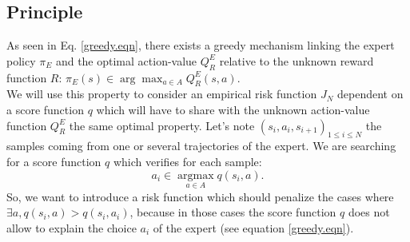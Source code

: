\documentclass{article}
\newcommand{\argmax}{\operatorname*{argmax}} %
\begin{document}
\subsection{Principle}
As seen in Eq. \eqref{greedy.eqn}, there exists a greedy mechanism linking the expert policy $\pi_E$ and the optimal action-value $Q^E_R$ relative to the unknown reward function $R$: $\pi_E(s) \in \arg\max_{a\in A}Q^E_R(s,a)$.\\
We will use this property to consider an empirical risk function $J_N$ dependent on a score function $q$ which will have to share with the unknown action-value function $Q^E_R$ the same optimal property. Let's note $(s_i,a_i,s_{i+1})_{1\leq i\leq N}$ the samples coming from one or several  trajectories of the expert. We are searching for a score function $q$ which verifies for each sample:
\begin{equation}
\label{butLAFEM.eqn}
a_i \in \argmax_{a\in A}q(s_i,a).
\end{equation}
So, we want to introduce a risk function which should penalize the cases where $\exists a, q(s_i,a)>q(s_i,a_i)$, because in those cases the score function $q$ does not allow to explain the choice $a_i$ of the expert (see equation \eqref{greedy.eqn}).
\end{document}
